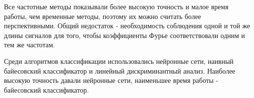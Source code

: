 Все частотные методы показывали более высокую точность и малое время работы, чем временные методы, поэтому их можно считать более перспективными. Общий недостаток - необходимость соблюдения одной и той же длины сигналов для того, чтобы коэффициенты Фурье соответствовали одним и тем же частотам.

Среди алгоритмов классификации использовались нейронные сети, наивный байесовский классификатор и линейный дискриминантный анализ. Наиболее высокую точность давали нейронные сети, наименьшее время работы - байесовский классификатор.


